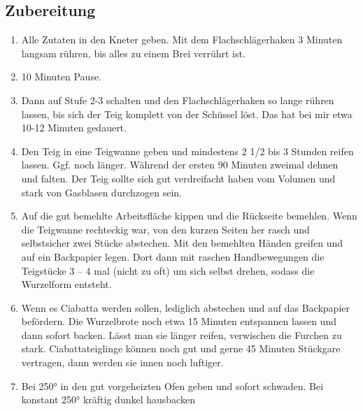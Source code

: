 \subsection*{Zubereitung}
\begin{enumerate}
   \item Alle Zutaten in den Kneter geben. Mit dem Flachschlägerhaken  3 Minuten langsam rühren, bis alles zu einem Brei verrührt ist.
   \item 10 Minuten Pause.
   \item Dann auf Stufe 2-3 schalten und den Flachschlägerhaken so lange rühren lassen, bis sich der Teig komplett von der Schüssel löst. Das hat bei mir etwa 10-12 Minuten gedauert.
   \item Den Teig in eine Teigwanne geben und mindestens 2 1/2 bis 3 Stunden reifen lassen. Ggf. noch länger. Während der ersten 90 Minuten zweimal dehnen und falten. Der Teig sollte sich gut verdreifacht haben vom Volumen und stark von Gasblasen durchzogen sein.
   \item Auf die gut bemehlte Arbeitsfläche kippen und die Rückseite bemehlen. Wenn die Teigwanne rechteckig war, von den kurzen Seiten her rasch und selbstsicher zwei Stücke abstechen. Mit den bemehlten Händen greifen und auf ein Backpapier legen. Dort dann mit raschen Handbewegungen die Teigstücke 3 – 4 mal (nicht zu oft) um sich selbst drehen, sodass die Wurzelform entsteht.
   \item Wenn es Ciabatta werden sollen, lediglich abstechen und auf das Backpapier befördern. Die Wurzelbrote noch etwa 15 Minuten entspannen lassen und dann sofort backen. Lässt man sie länger reifen, verwischen die Furchen zu stark. Ciabattateiglinge können noch gut und gerne 45 Minuten Stückgare vertragen, dann werden sie innen noch luftiger.
   \item Bei 250° in den gut vorgeheizten Ofen geben und sofort schwaden. Bei konstant 250° kräftig dunkel hausbacken
\end{enumerate}
 
